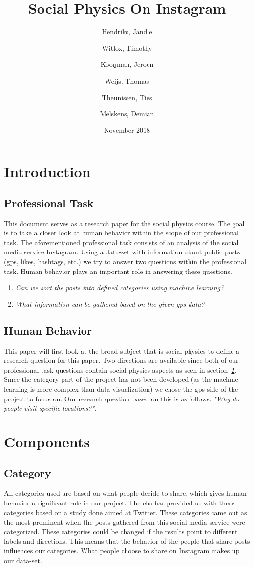 \documentclass{article}
\title{Social Physics On Instagram}
\author{
  Hendriks, Jandie\\
  \and
  Witlox, Timothy\\
  \and
  Kooijman, Jeroen\\
  \and
  Weijs, Thomas\\
  \and
  Theunissen, Ties\\
  \and
  Melskens, Demian\\
}
\date{November 2018}
\begin{document}
\maketitle
{}
\pagebreak
\tableofcontents
\pagebreak
{}
\section{Introduction}
\subsection{Professional Task}
This document serves as a research paper for the social physics course. The goal is to take a closer look at human behavior within the scope of our professional task. The aforementioned professional task consists of an analysis of the social media service Instagram. Using a data-set with information about public posts (\gls{gps}, likes, hashtags, etc.) we try to answer two questions within the professional task. Human behavior plays an important role in answering these questions. 
\begin{enumerate}
	\item \textit{Can we sort the posts into defined categories using machine learning?}
	\item \textit{What information can be gathered based on the given \gls{gps} data?}
\end{enumerate}
\subsection{Human Behavior}
This paper will first look at the broad subject that is social physics to define a research question for this paper. Two directions are available since both of our professional task questions contain social physics aspects as seen in section~\ref{sec:components}. Since the category part of the project has not been developed (as the machine learning is more complex than data visualization) we chose the \gls{gps} side of the project to focus on. Our research question based on this is as follows: \textit{"Why do people visit specific locations?"}.

\section{Components} \label{sec:components}
\subsection{Category}
All categories used are based on what people decide to share, which gives human behavior a significant role in our project. The \gls{cbs} has provided us with these categories based on a study done aimed at Twitter. These categories came out as the most prominent when the posts gathered from this social media service were categorized. These categories could be changed if the results point to different labels and directions. This means that the behavior of the people that share posts influences our categories. What people choose to share on Instagram makes up our data-set.
\end{document}
